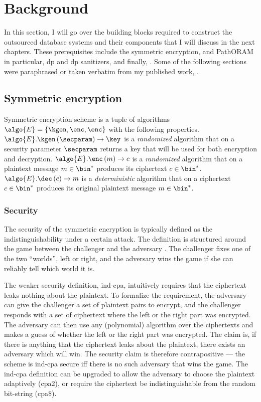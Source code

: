 \chapter{Background}\label{section:background}
\thispagestyle{myheadings}

	In this section, I will go over the building blocks required to construct the outsourced database systems and their components that I will discuss in the next chapters.
	These prerequisites include the symmetric encryption,  and PathORAM \cite{path-oram} in particular, \acrlong{dp} and \acrshort{dp} sanitizers, and finally, .
	Some of the following sections were paraphrased or taken verbatim from my published work, \cite{ore-benchmark-17,epsolute}.

	\section{Symmetric encryption}

		Symmetric encryption scheme is a tuple of algorithms $\algo{E} = \{ \kgen, \enc, \enc \}$ with the following properties.
		$\algo{E}.\kgen \left( \secparam \right) \to \key$ is a \emph{randomized} algorithm that on a security parameter $\secparam$ returns a key that will be used for both encryption and decryption.
		$\algo{E}.\enc \left( m \right) \to c$ is a \emph{randomized} algorithm that on a plaintext message $m \in \bin^*$ produces its ciphertext $c \in \bin^*$.
		$\algo{E}.\dec \left( c \right) \to m$ is a \emph{deterministic} algorithm that on a ciphertext $c \in \bin^*$ produces its original plaintext message $m \in \bin^*$.

		\subsection{Security}

			The security of the symmetric encryption is typically defined as the indistinguishability under a certain attack.
			The definition is structured around the game between the challenger and the adversary \adversary{}.
			The challenger fixes one of the two ``worlds'', left or right, and the adversary wins the game if she can reliably tell which world it is.

			The weaker security definition, \acrfull{ind-cpa}, intuitively requires that the ciphertext leaks nothing about the plaintext.
			To formalize the requirement, the adversary can give the challenger a set of plaintext pairs to encrypt, and the challenger responds with a set of ciphertext where the left or the right part was encrypted.
			The adversary can then use any (polynomial) algorithm over the ciphertexts and makes a guess of whether the left or the right part was encrypted.
			The claim is, if there is anything that the ciphertext leaks about the plaintext, there exists an adversary which will win.
			The security claim is therefore contrapositive --- the scheme is \acrshort{ind-cpa} secure iff there is no such adversary that wins the game.
			The \acrshort{ind-cpa} definition can be upgraded to allow the adversary to choose the plaintext adaptively (\acrshort{cpa}2), or require the ciphertext be indistinguishable from the random bit-string (\acrshort{cpa}\$).


